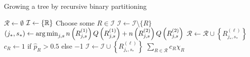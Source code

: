   \begin{algorithm}
    \caption{Growing a tree by recursive binary partitioning} \label{alg:tree}
    \begin{algorithmic}[1]
        \State $\mathcal{R} \gets \emptyset$ 
        \State $\mathcal{I} \gets \{ \mathbb{R} \}$ 
          \State Choose some $R \in \mathcal{I}$
          \State $\mathcal{I} \gets \mathcal{I} \setminus \{ R \}$
          \State $(j_*, s_*) \gets \operatorname*{arg\,min}_{j, s} n\left(R_{j,s}^{(1)}\right) Q\left(R_{j,s}^{(1)}\right) + 
            n\left(R_{j,s}^{(2)}\right) Q\left(R_{j,s}^{(2)}\right)$ \label{alg:tree:split}
              \State $\mathcal{R} \gets \mathcal{R} \cup \left\{ R_{j_*, s_*}^{(\ell)} \right\}$
              \State $c_R \gets 1$ if $\hat{p}_R > \num{0.5}$ else \num{-1}
            \Else
              \State $\mathcal{I} \gets \mathcal{I} \cup \left\{ R_{j_*, s_*}^{(\ell)} \right\}$
            \EndIf
          \EndFor
        \EndWhile
        \State \Return $\sum_{R \in \mathcal{R}} c_R \chi_R$
      \EndFunction
    \end{algorithmic}
  \end{algorithm}